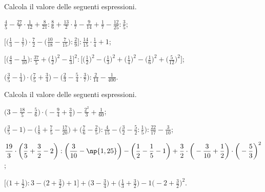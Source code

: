 \begin{esercizio}[\Ast]
 \label{ese:3.138}
Calcola il valore delle seguenti espressioni.
\begin{enumeratea}
\spazielenx
\item $\displaystyle{\frac{4}{5}-\frac{27}{7}\cdot{\frac{1}{12}}+\frac{8}{21}:\frac{8}{6}+\frac{13}{2}\cdot
\frac{1}{7}-\frac{9}{14}+\frac{1}{7}-\frac{12}{25}:\frac{3}{5}}$;
\item $\displaystyle{\bigg[\bigg(\frac{1}{3}-\frac{1}{7}\bigg)\cdot
{\frac{7}{2}}-\bigg(\frac{10}{18}-\frac{7}{15}\bigg):\frac{2}{9}\bigg]:\frac{14}{15}\cdot
{\frac{1}{4}}+1}$;
\item $\displaystyle{\bigg[\bigg(\frac{4}{3}-\frac{1}{10}\bigg):\frac{37}{5}+\bigg(\frac{1}{2}\bigg)^{2}-\frac{1}{3}%
\bigg]^{2}:\bigg[\bigg(\frac{1}{2}\bigg)^{2}-\bigg(\frac{1}{3}\bigg)^{2}+\bigg(\frac{1}{4}\bigg)^{2}-%
\bigg(\frac{1}{6}\bigg)^{2}+\bigg(\frac{5}{12}\bigg)^{2}\bigg]}$;
\item $\displaystyle{\bigg(\frac{3}{5}-\frac{1}{4}\bigg)\cdot\bigg(\frac{7}{5}+\frac{3}{4}\bigg)-\bigg(\frac{2}{3}-%
\frac{5}{4}\cdot\frac{3}{7}\bigg):\frac{2}{14}-\frac{1}{400}}$.
\end{enumeratea}
\end{esercizio}

\begin{esercizio}[\Ast]
 \label{ese:3.139}
 Calcola il valore delle seguenti espressioni.
\begin{enumeratea}
\spazielenx
\item $\displaystyle{\bigg(3-\frac{18}{5}-\frac{5}{6}\bigg)\cdot%
\bigg(-{\frac{9}{4}}+\frac{3}{4}\bigg)-\frac{2^{2}}{3}+\frac{1}{60}}$;
\item $\displaystyle{\bigg(\frac{3}{5}-1\bigg)-\bigg(\frac{1}{8}+\frac{7}{5}-\frac{17}{20}\bigg)+%
\bigg(\frac{7}{6}-\frac{2}{5}\bigg):\frac{4}{15}-\bigg(\frac{3}{2}-\frac{5}{2}:\frac{1}{5}\bigg):\frac{22}{17}-%
\frac{3}{10}}$;
\item $\displaystyle{\frac{19}{3}\cdot\bigg(\frac{3}{5}+\frac{3}{2}-2\bigg):\bigg(\frac{3}{10}-\np{1,25}\bigg)-%
\bigg(\frac{1}{2}-\frac{1}{5}-1\bigg)+\frac{3}{2}\cdot\bigg(-{\frac{3}{10}}+\frac{1}{2}\bigg)\cdot%
\bigg(-{\frac{5}{3}}\bigg)^{2}}$;
\item $\displaystyle{\bigg[\bigg(1+\frac{1}{2}\bigg):3-\bigg(2+\frac{3}{2}\bigg)+1\bigg]+\bigg(3-\frac{3}{4}\bigg)%
+\bigg(\frac{1}{3}+\frac{3}{2}\bigg)-1\bigg(-2+\frac{3}{2}\bigg)^{2}}$.
\end{enumeratea}
\end{esercizio}

